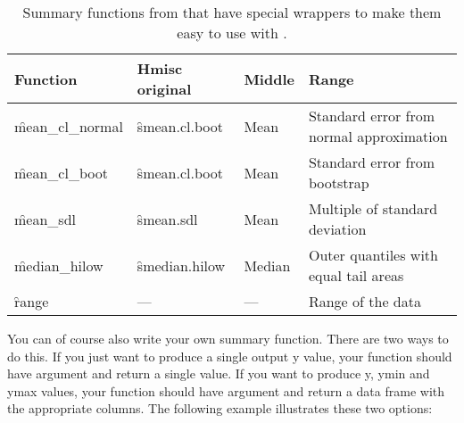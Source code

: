 % 

\begin{table}
  \begin{center}
  \begin{tabular}{lllp{2in}}
    \toprule
    Function & Hmisc original & Middle & Range \\
    \midrule 
    \f{mean_cl_normal} & \f{smean.cl.boot} & 
      Mean & Standard error from normal approximation \\
    \f{mean_cl_boot} & \f{smean.cl.boot} & 
      Mean & Standard error from bootstrap \\
    \f{mean_sdl} & \f{smean.sdl} & 
      Mean & Multiple of standard deviation  \\
    \f{median_hilow} & \f{smedian.hilow}  & 
      Median & Outer quantiles with equal tail areas \\
    \f{range} & --- & 
      --- & Range of the data\\
    \bottomrule
  \end{tabular}
  \end{center}
  \caption{Summary functions from  that have special wrappers to make them easy to use with .}
  \label{tbl:hmisc}
\end{table}

You can of course also write your own summary function.  There are two ways to do this.  If you just want to produce a single output y value, your function should have argument  and return a single value.  If you want to produce y, ymin and ymax values, your function should have argument  and return a data frame with the appropriate columns.  The following example illustrates these two options:

